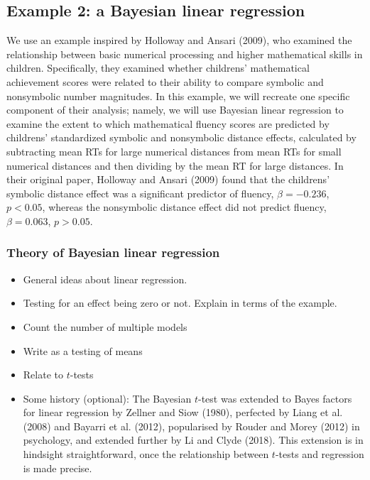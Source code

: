 \documentclass[english,,doc,floatsintext]{apa6}
\providecommand{\tightlist}{%
  \setlength{\itemsep}{0pt}\setlength{\parskip}{0pt}}
\begin{document}
\hypertarget{example-2-a-bayesian-linear-regression}{%
\subsection{Example 2: a Bayesian linear regression}\label{example-2-a-bayesian-linear-regression}}

We use an example inspired by Holloway and Ansari (2009), who examined the relationship between basic numerical processing and higher mathematical skills in children. Specifically, they examined whether childrens' mathematical achievement scores were related to their ability to compare symbolic and nonsymbolic number magnitudes. In this example, we will recreate one specific component of their analysis; namely, we will use Bayesian linear regression to examine the extent to which mathematical fluency scores are predicted by childrens' standardized symbolic and nonsymbolic distance effects, calculated by subtracting mean RTs for large numerical distances from mean RTs for small numerical distances and then dividing by the mean RT for large distances. In their original paper, Holloway and Ansari (2009) found that the childrens' symbolic distance effect was a significant predictor of fluency, \(\beta = -0.236\), \(p<0.05\), whereas the nonsymbolic distance effect did not predict fluency, \(\beta=0.063\), \(p>0.05\).

\hypertarget{theory-of-bayesian-linear-regression}{%
\subsubsection{Theory of Bayesian linear regression}\label{theory-of-bayesian-linear-regression}}

\begin{itemize}
\tightlist
\item
  General ideas about linear regression.
\item
  Testing for an effect being zero or not. Explain in terms of the example.
\item
  Count the number of multiple models
\item
  Write as a testing of means
\item
  Relate to \(t\)-tests
\item
  Some history (optional): The Bayesian \(t\)-test was extended to Bayes factors for linear regression by Zellner and Siow (1980), perfected by Liang et al. (2008) and Bayarri et al. (2012), popularised by Rouder and Morey (2012) in psychology, and extended further by Li and Clyde (2018). This extension is in hindsight straightforward, once the relationship between \(t\)-tests and regression is made precise.
\end{itemize}
\end{document}
